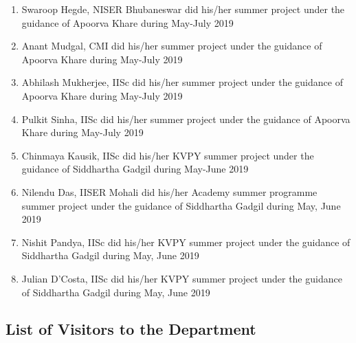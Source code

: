 \begin{enumerate}
\item Swaroop Hegde, NISER Bhubaneswar did his/her  summer project under the guidance of Apoorva Khare during May-July 2019
\item Anant Mudgal, CMI did his/her  summer project under the guidance of Apoorva Khare during May-July 2019
\item Abhilash Mukherjee, IISc did his/her  summer project under the guidance of Apoorva Khare during May-July 2019
\item Pulkit Sinha, IISc did his/her  summer project under the guidance of Apoorva Khare during May-July 2019
\item Chinmaya Kausik, IISc did his/her KVPY summer project under the guidance of Siddhartha Gadgil during May-June 2019
\item Nilendu Das, IISER Mohali did his/her Academy summer programme summer project under the guidance of Siddhartha Gadgil during May, June 2019
\item Nishit Pandya, IISc did his/her KVPY summer project under the guidance of Siddhartha Gadgil during May, June 2019
\item Julian D'Costa, IISc did his/her KVPY summer project under the guidance of Siddhartha Gadgil during May, June 2019
\end{enumerate}


\subsection{List of Visitors to the Department}

